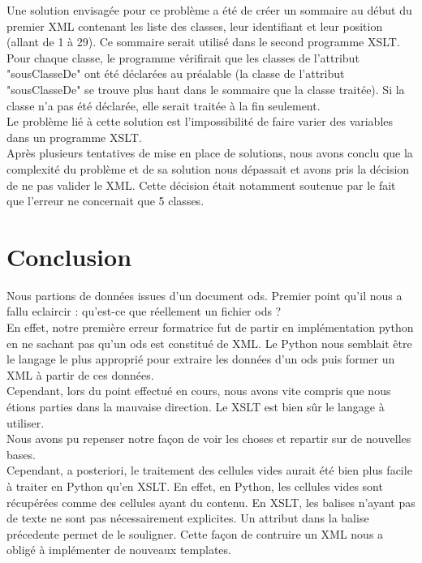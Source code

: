 \documentclass[11pt]{report}
\begin{document}
Une solution envisagée pour ce problème a été de créer un sommaire au début du premier XML contenant les liste des classes, leur identifiant et leur position (allant de 1 à 29). Ce sommaire serait utilisé dans le second programme XSLT. Pour chaque classe, le programme vérifirait que les classes de l'attribut "sousClasseDe" ont été déclarées au préalable (la classe de l'attribut "sousClasseDe" se trouve plus haut dans le sommaire que la classe traitée). Si la classe n'a pas été déclarée, elle serait traitée à la fin seulement. \\
Le problème lié à cette solution est l'impossibilité de faire varier des variables dans un programme XSLT. \\ 
Après plusieurs tentatives de mise en place de solutions, nous avons conclu que la complexité du problème et de sa solution nous dépassait et avons pris la décision de ne pas valider le XML. Cette décision était notamment soutenue par le fait que l'erreur ne concernait que 5 classes. \\


\chapter{Conclusion}


Nous partions de données issues d'un document ods. Premier point qu'il nous a fallu eclaircir : qu'est-ce que réellement un fichier ods ?\\
En effet, notre première erreur formatrice fut de partir en implémentation python en ne sachant pas qu'un ods est constitué de XML. Le Python nous semblait être le langage le plus approprié pour extraire les données d'un ods puis former un XML à partir de ces données.\\

Cependant, lors du point effectué en cours, nous avons vite compris que nous étions parties dans la mauvaise direction. Le XSLT est bien sûr le langage à utiliser.\\

Nous avons pu repenser notre façon de voir les choses et repartir sur de nouvelles bases.\\

Cependant, a posteriori, le traitement des cellules vides aurait été bien plus facile à traiter en Python qu'en XSLT. En effet, en Python, les cellules vides sont récupérées comme des cellules ayant du contenu. En XSLT, les balises n'ayant pas de texte ne sont pas nécessairement explicites. Un attribut dans la balise précedente permet de le souligner. Cette façon de contruire un XML nous a obligé à implémenter de nouveaux templates.\\
\end{document}
